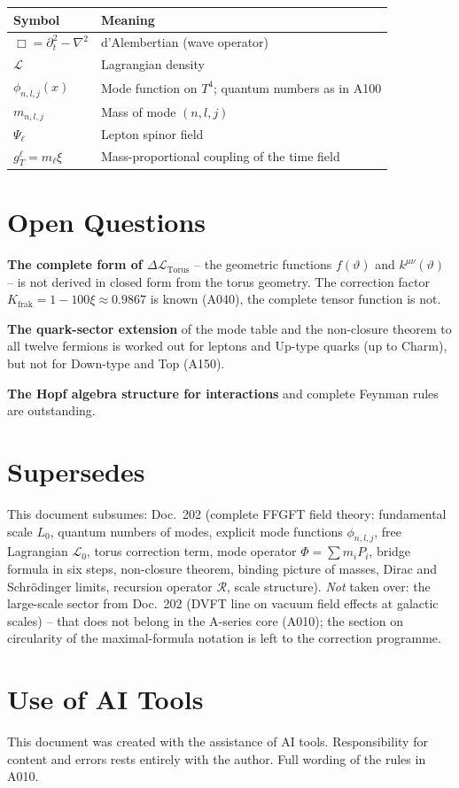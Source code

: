 \begin{center}
\renewcommand{\arraystretch}{1.3}
{\small\begin{tabular}{lp{9cm}}
\toprule
Symbol & Meaning \\
\midrule
$\Box = \partial_t^2 - \nabla^2$ & d'Alembertian (wave operator) \\
$\mathcal{L}$ & Lagrangian density \\
$\phi_{n,l,j}(x)$ & Mode function on $T^4$; quantum numbers as in A100 \\
$m_{n,l,j}$ & Mass of mode $(n,l,j)$ \\
$\Psi_\ell$ & Lepton spinor field \\
$g_T^\ell = m_\ell\xi$ & Mass-proportional coupling of the time field \\
\bottomrule
\end{tabular}}
\renewcommand{\arraystretch}{1.0}
\end{center}

\section{Open Questions}

\textbf{The complete form of $\Delta\mathcal L_{\text{Torus}}$} -- the geometric
functions $f(\vartheta)$ and $k^{\mu\nu}(\vartheta)$ -- is not derived in
closed form from the torus geometry. The correction factor $K_\text{frak}
=1-100\xi\approx0{.}9867$ is known (A040), the complete tensor function is not.

\textbf{The quark-sector extension} of the mode table and the non-closure theorem
to all twelve fermions is worked out for leptons and Up-type quarks (up to Charm),
but not for Down-type and Top (A150).

\textbf{The Hopf algebra structure for interactions} and complete Feynman rules
are outstanding.

\section{Supersedes}

This document subsumes: Doc.~202 (complete FFGFT field theory: fundamental scale
$L_0$, quantum numbers of modes, explicit mode functions $\phi_{n,l,j}$, free
Lagrangian $\mathcal L_0$, torus correction term, mode operator $\Phi=\sum m_i
P_i$, bridge formula in six steps, non-closure theorem, binding picture of
masses, Dirac and Schrödinger limits, recursion operator $\mathcal R$, scale
structure). \emph{Not} taken over: the large-scale sector from Doc.~202 (DVFT
line on vacuum field effects at galactic scales) -- that does not belong in the
A-series core (A010); the section on circularity of the maximal-formula notation
is left to the correction programme.

\section{Use of AI Tools}

This document was created with the assistance of AI tools.
Responsibility for content and errors rests entirely with the author.
Full wording of the rules in A010.
